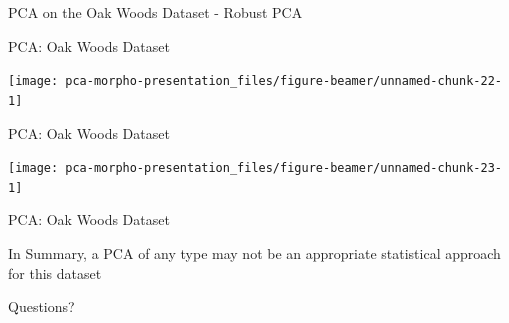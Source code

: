 \documentclass[ignorenonframetext,]{beamer}
\begin{document}
\begin{frame}{PCA on the Oak Woods Dataset - Robust PCA}
\protect\hypertarget{pca-on-the-oak-woods-dataset---robust-pca}{}

\begin{block}{PCA: Oak Woods Dataset}

\begin{center}\texttt{[image: pca-morpho-presentation\_files/figure-beamer/unnamed-chunk-22-1]} \end{center}

\end{block}

\begin{block}{PCA: Oak Woods Dataset}

\begin{center}\texttt{[image: pca-morpho-presentation\_files/figure-beamer/unnamed-chunk-23-1]} \end{center}

\end{block}

\begin{block}{PCA: Oak Woods Dataset}

In Summary, a PCA of any type may not be an appropriate statistical
approach for this dataset

\end{block}

\end{frame}

\begin{frame}{Questions?}
\protect\hypertarget{questions}{}

\end{frame}
\end{document}
